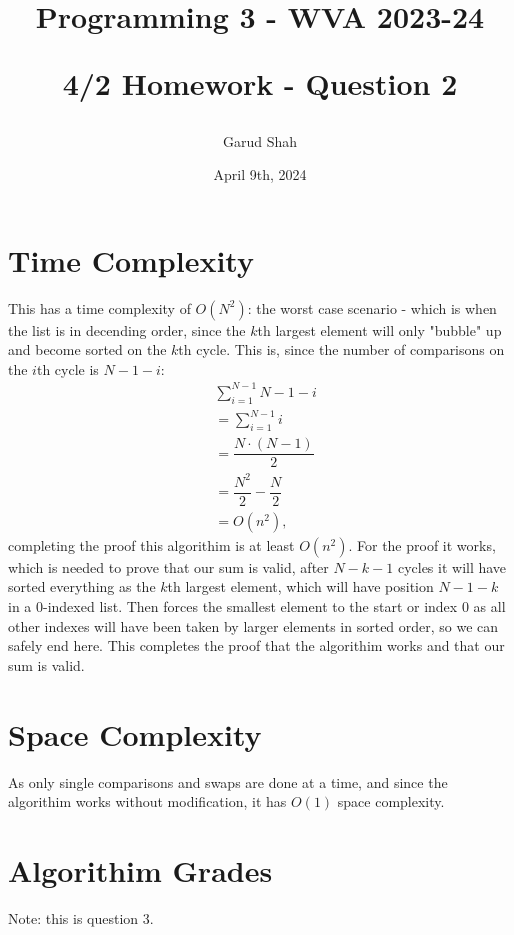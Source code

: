 \documentclass{article}
\title{
    \begin{center}
        Programming 3 - WVA 2023-24
    \end{center}
    \begin{center}
        \textbf{4/2 Homework - Question 2}
    \end{center}}
\date{April 9th, 2024}
\author{Garud Shah}
\begin{document}
\maketitle
\section{Time Complexity}
This has a time complexity of $O(N^2)$: the worst case scenario - which is when the list is in decending order, since the $k$th largest 
element will only "bubble" up and become sorted on the $k$th cycle. This is, since the number of comparisons on the $i$th cycle is $N-1-i$:
\begin{align}
    & \sum_{i=1}^{N-1} N-1-i \\
    &= \sum_{i=1}^{N-1} i \\
    &= \dfrac{N \cdot (N - 1)}{2} \\
    &= \dfrac{N^2}{2} - \dfrac{N}{2} \\
    &= \boxed{O(n^2)},
\end{align}
completing the proof this algorithim is at least $O(n^2)$. \newline
For the proof it works, which is needed to prove that our sum is valid, after $N - k - 1$ cycles it will have sorted everything as the 
$k$th largest element, which will have position $N - 1 - k$ in a $0$-indexed list. Then forces the smallest element to the start or index $0$ 
as all other indexes will have been taken by larger elements in sorted order, so we can safely end here. This completes the proof that the 
algorithim works and that our sum is valid.
\section{Space Complexity}
As only single comparisons and swaps are done at a time, and since the algorithim works without modification, it has $O(1)$ space complexity.
\section{Algorithim Grades}
Note: this is question 3.
\end{document}
